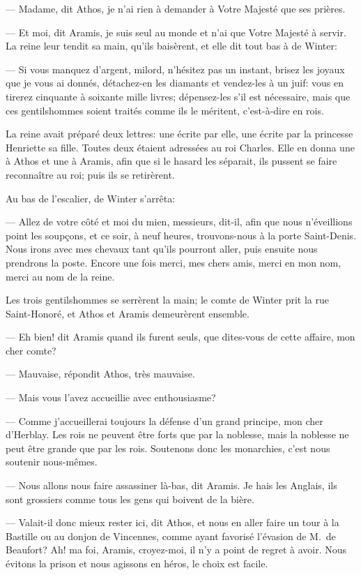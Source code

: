 — Madame, dit Athos, je n'ai rien à demander à Votre Majesté que ses prières.

— Et moi, dit Aramis, je suis seul au monde et n'ai que Votre Majesté à servir.
La reine leur tendit sa main, qu'ils baisèrent, et elle dit tout bas à de Winter:

— Si vous manquez d'argent, milord, n'hésitez pas un instant, brisez les joyaux que je vous ai donnés, détachez-en les diamants et vendez-les à un juif: vous en tirerez cinquante à soixante mille livres; dépensez-les s'il est nécessaire, mais que ces gentilshommes soient traités comme ils le méritent, c'est-à-dire en rois.

La reine avait préparé deux lettres: une écrite par elle, une écrite par la princesse Henriette sa fille. Toutes deux étaient adressées au roi Charles. Elle en donna une à Athos et une à Aramis, afin que si le hasard les séparait, ils pussent se faire reconnaître au roi; puis ils se retirèrent.

Au bas de l'escalier, de Winter s'arrêta:

— Allez de votre côté et moi du mien, messieurs, dit-il, afin que nous n'éveillions point les soupçons, et ce soir, à neuf heures, trouvons-nous à la porte Saint-Denis. Nous irons avec mes chevaux tant qu'ils pourront aller, puis ensuite nous prendrons la poste. Encore une fois merci, mes chers amis, merci en mon nom, merci au nom de la reine.

Les trois gentilshommes se serrèrent la main; le comte de Winter prit la rue Saint-Honoré, et Athos et Aramis demeurèrent ensemble.

— Eh bien! dit Aramis quand ils furent seuls, que dites-vous de cette affaire, mon cher comte?

— Mauvaise, répondit Athos, très mauvaise.

— Mais vous l'avez accueillie avec enthousiasme?

— Comme j'accueillerai toujours la défense d'un grand principe, mon cher d'Herblay. Les rois ne peuvent être forts que par la noblesse, mais la noblesse ne peut être grande que par les rois. Soutenons donc les monarchies, c'est nous soutenir nous-mêmes.

— Nous allons nous faire assassiner là-bas, dit Aramis. Je hais les Anglais, ils sont grossiers comme tous les gens qui boivent de la bière.

— Valait-il donc mieux rester ici, dit Athos, et nous en aller faire un tour à la Bastille ou au donjon de Vincennes, comme ayant favorisé l'évasion de M.~de Beaufort? Ah! ma foi, Aramis, croyez-moi, il n'y a point de regret à avoir. Nous évitons la prison et nous agissons en héros, le choix est facile.

